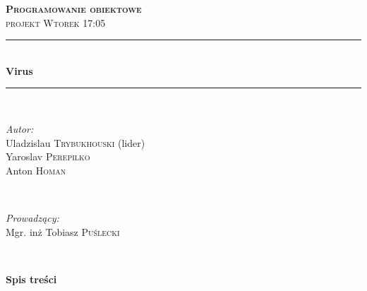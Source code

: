 \documentclass[a4paper]{article}
\author{Anton Homan (282992)}
\date{2024-06-14}
\begin{document}
\thispagestyle{empty}
	\begin{titlepage}
		\newcommand{\HRule}{\rule{\linewidth}{0.5mm}} %
		\center %
		\textsc{\Large \textbf{Programowanie obiektowe}}\\[0.5cm] 
		\textsc{\large projekt Wtorek 17:05}\\[0.5cm]
		\HRule \\[0.4cm]
		{ \huge \bfseries Virus
		}\\[0.4cm] 
		\HRule \\[0.8cm]
		\begin{minipage}{0.5\textwidth}
			\begin{flushleft} \large
				\emph{Autor:}\\
				Uladzislau  \textsc{Trybukhouski} (lider) \\
				Yaroslav \textsc{Perepilko}  \\
				Anton  \textsc{Homan}  \\
				
			\end{flushleft}
		\end{minipage}
		~
		\begin{minipage}{0.4\textwidth}
			\begin{flushright} \large
				\emph{Prowadzący:} \\
				Mgr. inż Tobiasz \textsc{Puślecki} %
			\end{flushright}
		\end{minipage}\\[5cm]
		
		\vfill %
	\end{titlepage}
	\newpage


{\centering
	\Large\textbf{Spis treści}
	\par}
\end{document}
